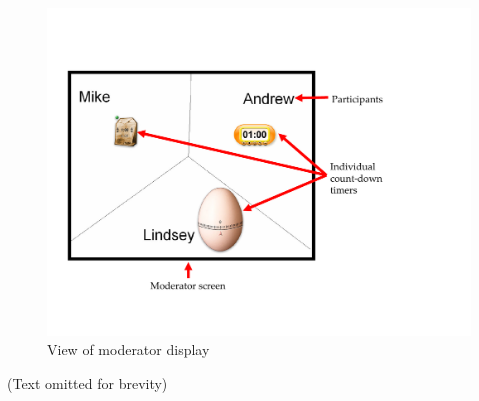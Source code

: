 \begin{figure}[htbp]
        \centering
                \includegraphics[width=1.00\textwidth]{Figures/Ch5/moderator.pdf}
        \caption{View of moderator display}
        \label{fig:moderator}
\end{figure}

\begin{center}
\color{blue}
(Text omitted for brevity)
\normalcolor
\end{center}




